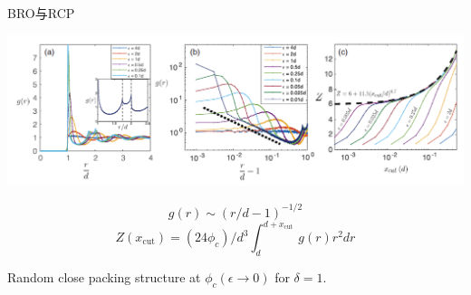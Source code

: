 \documentclass{bredelebeamer}
\begin{document}
\begin{frame}{BRO与RCP}
\centerline{\includegraphics[scale=0.2]{images/p11.png}}
$$g(r) \sim(r / d-1)^{-1 / 2}$$
$$Z\left(x_{\mathrm{cut}}\right)=\left(24 \phi_{c}\right) / d^{3} \int_{d}^{d+x_{\text {cut }}} g(r) r^{2} d r$$
\centerline{Random close packing structure at $\phi_{c}(\epsilon \rightarrow 0)$ for $\delta=1$.}
\end{frame}
\end{document}
